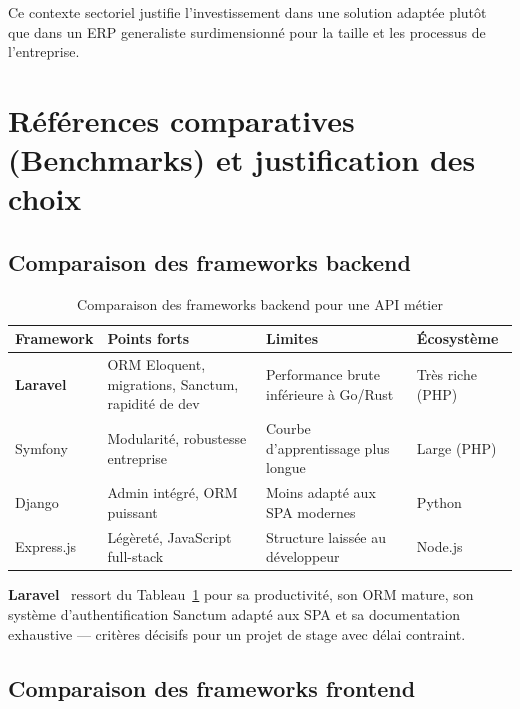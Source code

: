 Ce contexte sectoriel justifie l'investissement dans une solution adaptée plutôt que
dans un ERP generaliste surdimensionné pour la taille et les processus de l'entreprise.

\section{Références comparatives (Benchmarks) et justification des choix}

\subsection{Comparaison des frameworks backend}

\begin{table}[H]
\centering
\small
\caption{Comparaison des frameworks backend pour une API métier}
\label{tab:backend_benchmark}
\begin{tabular}{|l|p{3.2cm}|p{3.2cm}|p{3cm}|}
\hline
\textbf{Framework} & \textbf{Points forts} & \textbf{Limites} & \textbf{Écosystème} \\
\hline
\textbf{Laravel} & ORM Eloquent, migrations, Sanctum, rapidité de dev & Performance brute inférieure à Go/Rust & Très riche (PHP) \\
\hline
Symfony & Modularité, robustesse entreprise & Courbe d'apprentissage plus longue & Large (PHP) \\
\hline
Django & Admin intégré, ORM puissant & Moins adapté aux SPA modernes & Python \\
\hline
Express.js & Légèreté, JavaScript full-stack & Structure laissée au développeur & Node.js \\
\hline
\end{tabular}
\end{table}

\textbf{Laravel}~\cite{laravel} ressort du Tableau~\ref{tab:backend_benchmark} pour sa
productivité, son ORM mature, son système d'authentification Sanctum adapté aux SPA et
sa documentation exhaustive --- critères décisifs pour un projet de stage avec délai
contraint.

\subsection{Comparaison des frameworks frontend}

